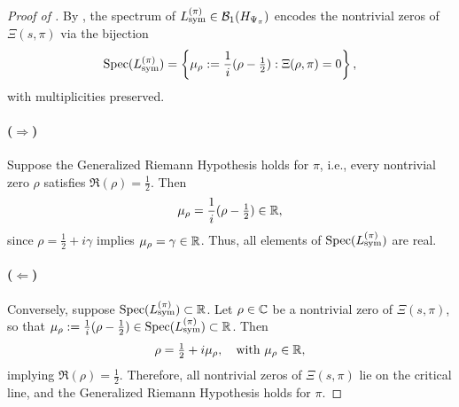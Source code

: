 \begin{proof}[Proof of ]
By , the spectrum of \( L_{\mathrm{sym}}^{(\pi)} \in \mathcal{B}_1(H_{\Psi_{\pi}}) \) encodes the nontrivial zeros of \( \Xi(s, \pi) \) via the bijection
\[
\operatorname{Spec}(L_{\mathrm{sym}}^{(\pi)}) = \left\{ \mu_\rho := \frac{1}{i}(\rho - \tfrac{1}{2}) : \Xi(\rho, \pi) = 0 \right\},
\]
with multiplicities preserved.

\paragraph{(\( \Rightarrow \))} Suppose the Generalized Riemann Hypothesis holds for \( \pi \), i.e., every nontrivial zero \( \rho \) satisfies \( \Re(\rho) = \tfrac{1}{2} \). Then
\[
\mu_\rho = \frac{1}{i}(\rho - \tfrac{1}{2}) \in \mathbb{R},
\]
since \( \rho = \tfrac{1}{2} + i\gamma \) implies \( \mu_\rho = \gamma \in \mathbb{R} \). Thus, all elements of \( \operatorname{Spec}(L_{\mathrm{sym}}^{(\pi)}) \) are real.

\paragraph{(\( \Leftarrow \))} Conversely, suppose \( \operatorname{Spec}(L_{\mathrm{sym}}^{(\pi)}) \subset \mathbb{R} \). Let \( \rho \in \mathbb{C} \) be a nontrivial zero of \( \Xi(s, \pi) \), so that \( \mu_\rho := \tfrac{1}{i}(\rho - \tfrac{1}{2}) \in \operatorname{Spec}(L_{\mathrm{sym}}^{(\pi)}) \subset \mathbb{R} \). Then
\[
\rho = \tfrac{1}{2} + i \mu_\rho, \quad \text{with } \mu_\rho \in \mathbb{R},
\]
implying \( \Re(\rho) = \tfrac{1}{2} \). Therefore, all nontrivial zeros of \( \Xi(s, \pi) \) lie on the critical line, and the Generalized Riemann Hypothesis holds for \( \pi \).

\end{proof}
